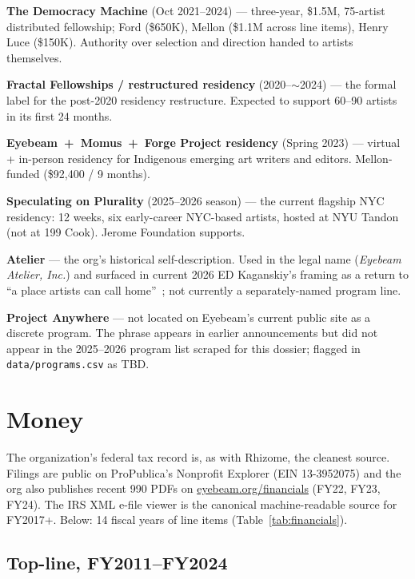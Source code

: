 \documentclass[10pt,letterpaper,twocolumn]{article}
\begin{document}
\textbf{The Democracy Machine} (Oct 2021--2024) --- three-year, \$1.5M, 75-artist distributed fellowship; Ford (\$650K), Mellon (\$1.1M across line items), Henry Luce (\$150K). Authority over selection and direction handed to artists themselves.

\textbf{Fractal Fellowships / restructured residency} (2020--$\sim$2024) --- the formal label for the post-2020 residency restructure. Expected to support 60--90 artists in its first 24 months.

\textbf{Eyebeam~+~Momus~+~Forge Project residency} (Spring 2023) --- virtual + in-person residency for Indigenous emerging art writers and editors. Mellon-funded (\$92{,}400 / 9 months).

\textbf{Speculating on Plurality} (2025--2026 season) --- the current flagship NYC residency: 12 weeks, six early-career NYC-based artists, hosted at NYU Tandon (not at 199 Cook). Jerome Foundation supports.

\textbf{Atelier} --- the org's historical self-description. Used in the legal name (\emph{Eyebeam Atelier, Inc.}) and surfaced in current 2026 ED Kaganskiy's framing as a return to ``a place artists can call home''~\citep{eyebeam2026kaganskiy}; not currently a separately-named program line.

\textbf{Project Anywhere} --- not located on Eyebeam's current public site as a discrete program. The phrase appears in earlier announcements but did not appear in the 2025--2026 program list scraped for this dossier; flagged in \texttt{data/programs.csv} as TBD.

\section{Money}\label{sec:money}

The organization's federal tax record is, as with Rhizome, the cleanest source. Filings are public on ProPublica's Nonprofit Explorer (EIN 13-3952075) and the org also publishes recent 990 PDFs on \href{https://eyebeam.org/financials/}{eyebeam.org/financials} (FY22, FY23, FY24). The IRS XML e-file viewer is the canonical machine-readable source for FY2017+. Below: 14 fiscal years of line items (Table~\ref{tab:financials}).

\subsection{Top-line, FY2011--FY2024}
\end{document}
